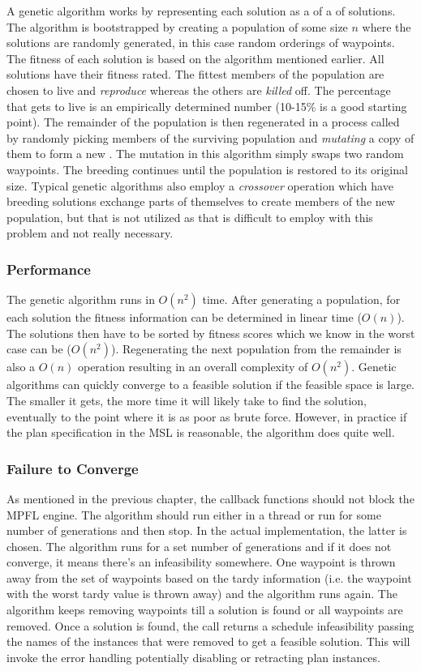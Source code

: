 A genetic algorithm works by representing each solution as a  of a  of solutions. The algorithm is bootstrapped by creating a population of some size $n$ where the solutions are randomly generated, in this case random orderings of waypoints. The fitness of each solution is based on the algorithm mentioned earlier. All solutions have their fitness rated. The fittest members of the population are chosen to live and \emph{reproduce} whereas the others are \emph{killed} off. The percentage that gets to live is an empirically determined number (10-15\% is a good starting point). The remainder of the population is then regenerated in a process called  by randomly picking members of the surviving population and \emph{mutating} a copy of them to form a new . The mutation in this algorithm simply swaps two random waypoints. The breeding continues until the population is restored to its original size. Typical genetic algorithms also employ a \emph{crossover} operation which have breeding solutions exchange parts of themselves to create members of the new population, but that is not utilized as that is difficult to employ with this problem and not really necessary.

\subsubsection{Performance}
The genetic algorithm runs in $O(n^2)$ time. After generating a population, for each solution the fitness information can be determined in linear time ($O(n)$). The solutions then have to be sorted by fitness scores which we know in the worst case can be ($O(n^2)$). Regenerating the next population from the remainder is also a $O(n)$ operation resulting in an overall complexity of $O(n^2)$. Genetic algorithms can quickly converge to a feasible solution if the feasible space is large. The smaller it gets, the more time it will likely take to find the solution, eventually to the point where it is as poor as brute force. However, in practice if the plan specification in the MSL is reasonable, the algorithm does quite well.

\subsubsection{Failure to Converge}
As mentioned in the previous chapter, the callback functions should not block the MPFL engine. The algorithm should run either in a thread or run for some number of generations and then stop. In the actual implementation, the latter is chosen. The algorithm runs for a set number of generations and if it does not converge, it means there's an infeasibility somewhere. One waypoint is thrown away from the set of waypoints based on the tardy information (i.e. the waypoint with the worst tardy value is thrown away) and the algorithm runs again. The algorithm keeps removing waypoints till a solution is found or all waypoints are removed. Once a solution is found, the  call returns a schedule infeasibility passing the names of the instances that were removed to get a feasible solution. This will invoke the error handling potentially disabling or retracting plan instances.

